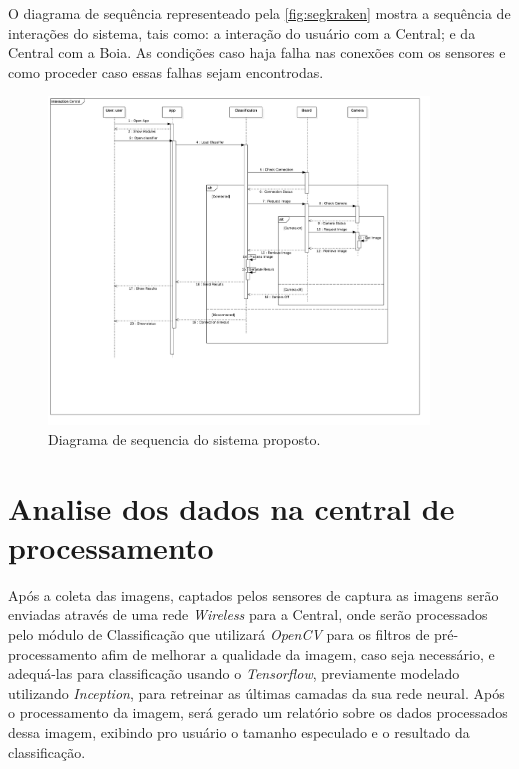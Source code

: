 

O diagrama de sequência representeado pela \autoref{fig:segkraken} mostra a sequência de interações do sistema, tais como: a interação do usuário com a Central; e da Central com a Boia. As condições caso haja falha nas conexões com os sensores e como proceder caso essas falhas sejam encontrodas.

\begin{figure}[ht]
	\caption{\label{fig:seqkraken}  Diagrama de sequencia do sistema proposto.}
	 \begin{center}
		\includegraphics[width = 0.9\textwidth]			{resources/sequencekraken}
    \end{center}
\end{figure}




\section{Analise dos dados na central de processamento}

Após a coleta das imagens, captados pelos sensores de captura as imagens serão enviadas através de uma rede \textit{Wireless} para a Central, onde serão processados pelo módulo de Classificação que utilizará \textit{OpenCV} para os filtros de pré-processamento afim de melhorar a qualidade da imagem, caso seja necessário, e adequá-las para classificação usando o \textit{Tensorflow}, previamente modelado utilizando \textit{Inception}, para retreinar as últimas camadas da sua rede neural. 
Após o processamento da imagem, será gerado um relatório sobre os dados processados dessa imagem, exibindo pro usuário o tamanho especulado e o resultado da classificação.

